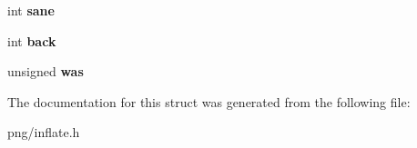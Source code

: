 \begin{DoxyCompactItemize}
\item 
int {\bfseries sane}\hypertarget{structinflate__state_a98b40fe23b7177bc8cd1d9d73edad593}{}\label{structinflate__state_a98b40fe23b7177bc8cd1d9d73edad593}

\item 
int {\bfseries back}\hypertarget{structinflate__state_ab666ce74a806fc77200ced9bc385cb0b}{}\label{structinflate__state_ab666ce74a806fc77200ced9bc385cb0b}

\item 
unsigned {\bfseries was}\hypertarget{structinflate__state_a0e3af9175f6d3b30f83af69062ba4dec}{}\label{structinflate__state_a0e3af9175f6d3b30f83af69062ba4dec}

\end{DoxyCompactItemize}


The documentation for this struct was generated from the following file\+:\begin{DoxyCompactItemize}
\item 
png/inflate.\+h\end{DoxyCompactItemize}
